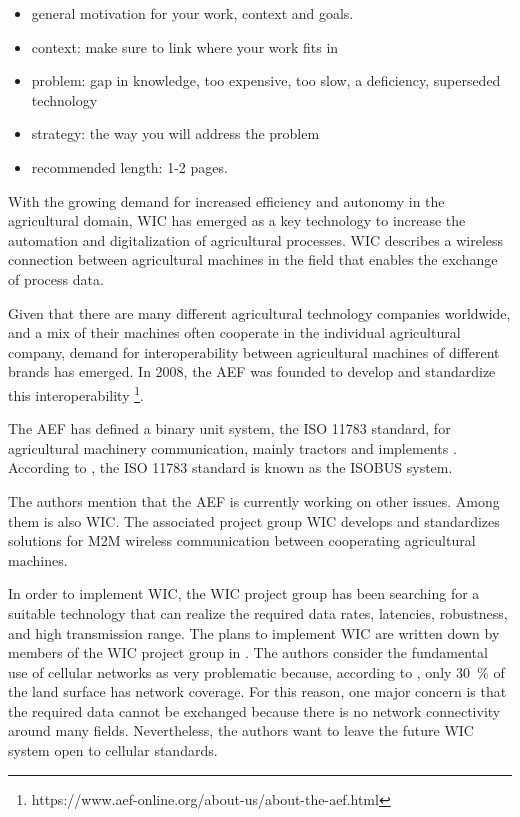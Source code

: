
\begin{itemize}
\item general motivation for your work, context and goals.
\item context: make sure to link where your work fits in
\item problem: gap in knowledge, too expensive, too slow, a deficiency, superseded technology
\item strategy: the way you will address the problem
\item recommended length: 1-2 pages.
\end{itemize}
With the growing demand for increased efficiency and autonomy in the agricultural domain, \ac{WIC} has emerged as a key technology to increase the automation
and digitalization of agricultural processes. \ac{WIC} describes a wireless connection between agricultural machines
in the field that enables the exchange of process data.

Given that there are many different agricultural technology companies worldwide, and a mix of their machines often cooperate in
the individual agricultural company, demand for interoperability between agricultural machines of different brands
has emerged.
In 2008, the \ac{AEF} was founded to develop and standardize this interoperability
\footnote{https://www.aef-online.org/about-us/about-the-aef.html}.

The AEF has defined a binary unit system, the ISO 11783 standard, for agricultural machinery communication, mainly tractors and
implements \cite{iglesias_enabling_2014}. According to \textcite{schlingmann_aef_2019}, the ISO 11783 standard is known as
the ISOBUS system.

The authors mention that the AEF is currently working on other issues. Among them is also \ac{WIC}.
The associated project group \ac{WIC} develops and standardizes solutions for \ac{M2M} wireless
communication between cooperating agricultural machines.

In order to implement \ac{WIC}, the \ac{WIC} project group has been searching for a suitable technology
that can realize the required data rates, latencies, robustness, and high transmission range.
The plans to implement \ac{WIC} are written down by members of the \ac{WIC} project group in \cite{schlingmann_challenges_2017}.
The authors consider the fundamental use of cellular networks as very problematic
because, according to \cite{itu2016facts}, only \SI{30}{\percent} of the land surface has network coverage.
For this reason, one major concern is that the required data cannot be exchanged because there is
no network connectivity around many fields. Nevertheless, the authors want to leave the future \ac{WIC} system open
to cellular standards.


